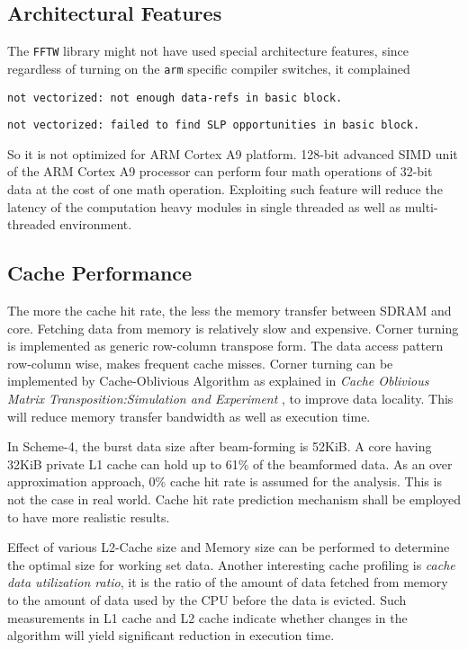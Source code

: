 \subsection{Architectural Features}
The \verb|FFTW| library might not have used special architecture features, since regardless of turning on the \verb|arm| specific compiler switches, it complained 
\begin{compactitem}
	\item[] \verb|not vectorized: not enough data-refs in basic block.|
	\item[] \verb|not vectorized: failed to find SLP opportunities in basic block.|
\end{compactitem}
So it is not optimized for ARM Cortex A9 platform. 128-bit advanced SIMD unit of the ARM Cortex A9 processor can perform four math operations of 32-bit data at the cost of one math operation. Exploiting such feature will reduce the latency of the computation heavy modules in single threaded as well as multi-threaded environment.

\subsection{Cache Performance}
The more the cache hit rate, the less the memory transfer between SDRAM and core. Fetching data from memory is relatively slow and expensive. Corner turning is implemented as generic row-column transpose form. The data access pattern row-column wise, makes frequent cache misses. Corner turning can be implemented by Cache-Oblivious Algorithm as explained in \textsl{Cache Oblivious Matrix Transposition:Simulation and Experiment} \cite{cot}, to improve data locality. This will reduce memory transfer bandwidth as well as execution time.  

In Scheme-4, the burst data size after beam-forming is 52KiB. A core having 32KiB private L1 cache can hold up to 61\% of the beamformed data. As an over approximation approach, 0\% cache hit rate is assumed for the analysis. This is not the case in real world. Cache hit rate prediction mechanism shall be employed to have more realistic results.

Effect of various L2-Cache size and Memory size can be performed to determine the optimal size for working set data. Another interesting cache profiling is \textsl{cache data utilization ratio}, it is the ratio of the amount of data fetched from memory to the amount of data used by the CPU before the data is evicted. Such measurements in L1 cache and L2 cache indicate whether changes in the algorithm will yield significant reduction in execution time.

